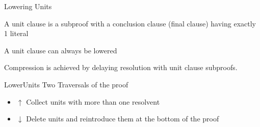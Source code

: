 
\begin{frame}{Lowering Units}
\begin{definition}[Unit]
A unit clause is a subproof with a conclusion clause (final clause) having exactly 1 literal
\end{definition}
\begin{theorem}
A unit clause can always be lowered
\end{theorem}
\vspace{0.5cm}
Compression is achieved by delaying resolution with unit clause subproofs.\\
\vspace{0.5cm}


\end{frame}

\begin{frame}{LowerUnits}
Two Traversals of the proof
\begin{itemize}
\item $\uparrow$ Collect units with more than one resolvent
\item $\downarrow$ Delete units and reintroduce them at the bottom of the proof
\end{itemize}

\end{frame}




